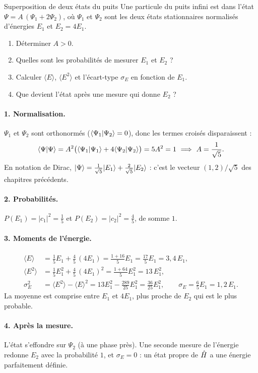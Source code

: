 \begin{exercice}{Superposition de deux états du puits}\label{ex:superpuits}
Une particule du puits infini est dans l'état $\Psi=A\,(\Psi_1+2\Psi_2)$, où $\Psi_1$ et $\Psi_2$ sont
les deux états stationnaires normalisés d'énergies $E_1$ et $E_2=4E_1$.
\begin{enumerate}[label=\arabic*.,nosep]
  \item Déterminer $A>0$.
  \item Quelles sont les probabilités de mesurer $E_1$ et $E_2$ ?
  \item Calculer $\langle E\rangle$, $\langle E^2\rangle$ et l'écart-type $\sigma_E$ en fonction de $E_1$.
  \item Que devient l'état après une mesure qui donne $E_2$ ?
\end{enumerate}
\end{exercice}
\begin{correction}
\paragraph{1. Normalisation.} $\Psi_1$ et $\Psi_2$ sont orthonormés ($\langle \Psi_1|\Psi_2\rangle=0$),
donc les termes croisés disparaissent :
\[
  \langle \Psi|\Psi\rangle=A^2\big(\langle \Psi_1|\Psi_1\rangle+4\langle \Psi_2|\Psi_2\rangle\big)=5A^2=1
  \ \Longrightarrow\ A=\frac{1}{\sqrt5}.
\]
En notation de Dirac, $|\Psi\rangle=\frac{1}{\sqrt5}|E_1\rangle+\frac{2}{\sqrt5}|E_2\rangle$ : c'est le
vecteur $(1,2)/\sqrt5$ des chapitres précédents.

\paragraph{2. Probabilités.} $P(E_1)=|c_1|^2=\frac15$ et $P(E_2)=|c_2|^2=\frac45$, de somme $1$.

\paragraph{3. Moments de l'énergie.}
\begin{align*}
  \langle E\rangle&=\tfrac15E_1+\tfrac45\,(4E_1)=\tfrac{1+16}{5}E_1=\tfrac{17}{5}E_1=3{,}4\,E_1,\\
  \langle E^2\rangle&=\tfrac15E_1^2+\tfrac45\,(4E_1)^2=\tfrac{1+64}{5}E_1^2=13\,E_1^2,\\
  \sigma_E^2&=\langle E^2\rangle-\langle E\rangle^2=13E_1^2-\tfrac{289}{25}E_1^2=\tfrac{36}{25}E_1^2,
  \qquad\sigma_E=\tfrac65E_1=1{,}2\,E_1 .
\end{align*}
La moyenne est comprise entre $E_1$ et $4E_1$, plus proche de $E_2$ qui est le plus probable.

\paragraph{4. Après la mesure.} L'état s'effondre sur $\Psi_2$ (à une phase près). Une seconde mesure
de l'énergie redonne $E_2$ avec la probabilité $1$, et $\sigma_E=0$ : un état propre de $\hat{H}$ a une
énergie parfaitement définie.
\end{correction}


